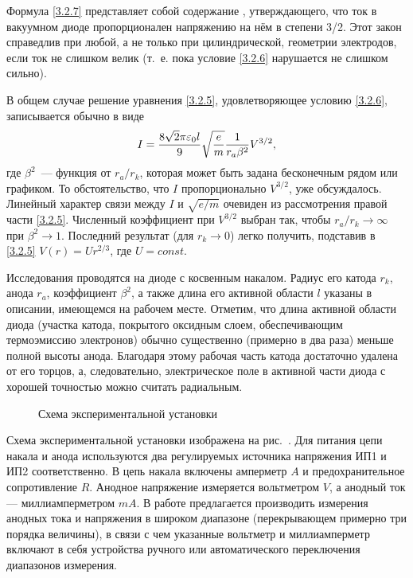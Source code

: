 Формула \eqref{3.2.7} представляет собой содержание , утверждающего, что ток в вакуумном диоде пропорционален напряжению на нём в степени 3/2. Этот закон справедлив при любой, а не только при цилиндрической, геометрии электродов, если ток не слишком велик (т.~е. пока условие \eqref{3.2.6} нарушается не слишком сильно).

В общем случае решение уравнения \eqref{3.2.5}, удовлетворяющее условию \eqref{3.2.6}, записывается обычно в виде
\begin{equation}
	I=\frac{8\sqrt{2}\pi\varepsilon_0l}{9}\sqrt{\frac{e}{m}}\frac{1}{r_a\beta^2}V^{3/2},
	\eqmark{3.2.8}
\end{equation}
где $\beta^2$~--- функция от $r_a/r_k$, которая может быть задана бесконечным рядом или графиком. То обстоятельство, что $I$ пропорционально $V^{3/2}$, уже обсуждалось. Линейный характер связи между $I$ и $\sqrt{e/m}$ очевиден из
рассмотрения правой части \eqref{3.2.5}. Численный коэффициент при $V^{3/2}$ выбран так, чтобы $r_a/r_k\rightarrow\infty$ при $\beta^2\rightarrow 1$. Последний результат (для $r_k\rightarrow 0$) легко получить, подставив в \eqref{3.2.5} $V(r)=Ur^{2/3} $, где $U=const$.

\experiment Исследования проводятся на диоде с косвенным накалом. Радиус его катода $r_k$, анода $r_a$,  коэффициент $\beta^2$, а также длина его активной области $l$  указаны в описании, имеющемся на рабочем месте. Отметим, что длина активной области диода (участка катода, покрытого оксидным слоем, обеспечивающим термоэмиссию электронов) обычно существенно (примерно в два раза) меньше полной высоты анода. Благодаря этому рабочая часть катода достаточно удалена от его торцов, а, следовательно,  электрическое поле в активной части диода с хорошей точностью можно считать радиальным.
\begin{figure}[h!]
	\caption{Схема экспериментальной установки}
\end{figure}

Схема экспериментальной установки изображена на рис.~. Для питания цепи накала и анода используются два регулируемых источника напряжения ИП1 и ИП2 соответственно. В цепь накала включены амперметр $A$ и предохранительное сопротивление $R$. Анодное напряжение измеряется вольтметром $V$, а анодный ток --- миллиамперметром $mA$. В работе предлагается производить измерения анодных тока и напряжения в широком диапазоне (перекрывающем примерно три порядка величины), в связи с чем указанные вольтметр и миллиамперметр включают в себя устройства ручного или автоматического переключения диапазонов измерения.  

